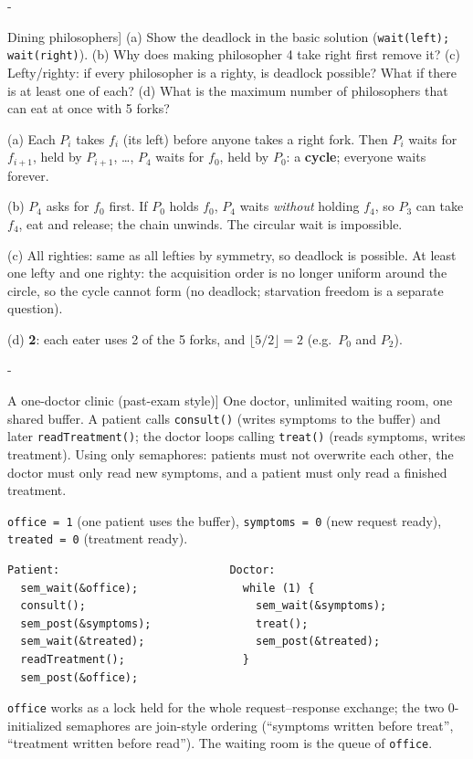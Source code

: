 \documentclass[11pt,a4paper]{article}
\makeatletter
\newcommand{\keepspace}[1]{\par\penalty-100\begingroup
  \setlength{\dimen@}{#1}\dimen@ii\pagegoal\advance\dimen@ii-\pagetotal
  \ifdim\dimen@>\dimen@ii\ifdim\dimen@ii>\z@\vfil\fi\break\fi\endgroup}
\newcounter{qn}[section]
\newcommand{\lecno}{}
\newenvironment{Qn}[2]{\refstepcounter{qn}\keepspace{8\baselineskip}%
  \begin{quizbox}[Q\lecno.\theqn\ \ [#1] #2]}{\end{quizbox}}
\newenvironment{Sol}{\begin{solbox}[Solution]}{\end{solbox}\vspace{0.4em}}
\makeatother
\begin{document}
\begin{Qn}{Concept}{Dining philosophers}
(a) Show the deadlock in the basic solution
(\texttt{wait(left); wait(right)}). (b) Why does making philosopher 4
take right first remove it? (c) Lefty/righty: if every philosopher is a
righty, is deadlock possible? What if there is at least one of each?
(d) What is the maximum number of philosophers that can eat at once with 5
forks?
\end{Qn}
\begin{Sol}
(a) Each \(P_i\) takes \(f_i\) (its left) before anyone takes a right
fork. Then \(P_i\) waits for \(f_{i+1}\), held by \(P_{i+1}\), \ldots,
\(P_4\) waits for \(f_0\), held by \(P_0\): a \textbf{cycle}; everyone
waits forever.

(b) \(P_4\) asks for \(f_0\) first. If \(P_0\) holds \(f_0\), \(P_4\) waits
\emph{without} holding \(f_4\), so \(P_3\) can take \(f_4\), eat and release;
the chain unwinds. The circular wait is impossible.

(c) All righties: same as all lefties by symmetry, so deadlock is
possible. At least one lefty and one righty: the acquisition order is no
longer uniform around the circle, so the cycle cannot form (no deadlock;
starvation freedom is a separate question).

(d) \textbf{2}: each eater uses 2 of the 5 forks, and
\(\lfloor 5/2 \rfloor = 2\) (e.g.\ \(P_0\) and \(P_2\)).
\end{Sol}

\begin{Qn}{Design}{A one-doctor clinic (past-exam style)}
One doctor, unlimited waiting room, one shared buffer. A patient calls
\texttt{consult()} (writes symptoms to the buffer) and later
\texttt{readTreatment()}; the doctor loops calling \texttt{treat()} (reads
symptoms, writes treatment). Using only semaphores: patients must not
overwrite each other, the doctor must only read new symptoms, and a patient
must only read a finished treatment.
\end{Qn}
\begin{Sol}
\texttt{office = 1} (one patient uses the buffer), \texttt{symptoms = 0}
(new request ready), \texttt{treated = 0} (treatment ready).
\begin{lstlisting}[numbers=none]
Patient:                          Doctor:
  sem_wait(&office);                while (1) {
  consult();                          sem_wait(&symptoms);
  sem_post(&symptoms);                treat();
  sem_wait(&treated);                 sem_post(&treated);
  readTreatment();                  }
  sem_post(&office);
\end{lstlisting}
\texttt{office} works as a lock held for the whole request--response
exchange; the two 0-initialized semaphores are join-style ordering
(``symptoms written before treat'', ``treatment written before read''). The
waiting room is the queue of \texttt{office}.
\end{Sol}
\end{document}
